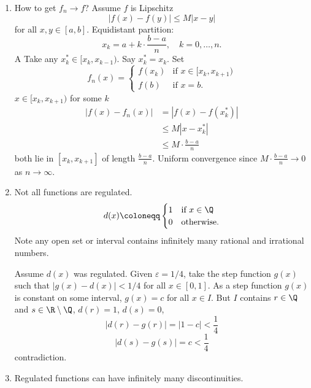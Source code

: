 \documentclass[10pt, a4paper]{article}
\begin{document}
\begin{example}
    \begin{enumerate}[label = (\arabic*)]
        \item How to get $f_n \to f$?
        Assume $f$ is Lipschitz
        \[
        |f(x) - f(y)| \leq M|x - y|
        \]
        for all $x, y \in [a, b]$.
        Equidistant partition:
        \[
        x_k = a + k \cdot \frac{b - a}{n}, \quad k = 0, \dotsc, n.
        \]A
        Take any $x_k ^ {*} \in [x_k, x_{k - 1})$.
        Say $x_k ^ {*} = x_k$.
        Set
        \[
        f_n(x) = \begin{cases}
            f(x_k) &\text{if } x \in [x_k, x_{k + 1}) \\
            f(b) &\text{if } x = b.
        \end{cases}
        \]
        $x \in [x_k, x_{k + 1})$ for some $k$
        \begin{align*}
            |f(x) - f_n(x)| &= |f(x) - f(x_k ^ {*})| \\
            &\leq M|x - x_k ^ {*}| \\
            &\leq M\cdot\frac{b - a}{n}
        \end{align*}
        both lie in $[x_k, x_{k + 1}]$ of length $\frac{b - a}{n}$.
        Uniform convergence since $M\cdot\frac{b - a}{n} \to 0$ as $n \to \infty$.

        \item Not all functions are regulated.
        \[
        d(x) \coloneqq \begin{cases}
            1 &\text{if } x \in \Q \\
            0 &\text{otherwise}.
        \end{cases}
        \]
        Note any open set or interval contains infinitely many rational and irrational numbers.

        Assume $d(x)$ was regulated.
        Given $\varepsilon = 1 / 4$,
        take the step function $g(x)$ such that $|g(x) - d(x)| < 1 / 4$ for all $x \in [0, 1]$.
        As a step function $g(x)$ is constant on some interval,
        $g(x) = c$ for all $x \in I$.
        But $I$ contains $r \in \Q$ and $s \in \R \setminus \Q$,
        $d(r) = 1$,
        $d(s) = 0$,
        \[
        |d(r) - g(r)| = |1 - c| < \frac{1}{4}
        \]
        \[
        |d(s) - g(s)| = c < \frac{1}{4}
        \]
        contradiction.

        \item Regulated functions can have infinitely many discontinuities.


\end{enumerate}
\end{example}
\end{document}
